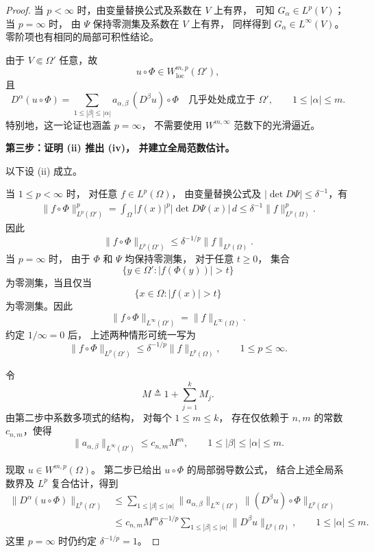 \documentclass[../../main.tex]{subfiles}%
\begin{document}
\begin{proof}
当 $p<\infty$ 时，由变量替换公式及系数在 $V$ 上有界，
可知 $G_\alpha\in L^p(V)$；
当 $p=\infty$ 时，
由 $\Psi$ 保持零测集及系数在 $V$ 上有界，
同样得到 $G_\alpha\in L^\infty(V)$。
零阶项也有相同的局部可积性结论。

由于 $V\Subset\Omega'$ 任意，故
\[
u\circ\Phi\in W^{m,p}_{\mathrm{loc}}(\Omega'),
\]
且
\[
D^\alpha(u\circ\Phi)
=
\sum_{1\leqslant|\beta|\leqslant|\alpha|}
a_{\alpha,\beta}\,(D^\beta u)\circ\Phi
\quad\text{几乎处处成立于 }\Omega',
\qquad 1\leqslant|\alpha|\leqslant m.
\]
特别地，这一论证也涵盖 $p=\infty$，
不需要使用 $W^{m,\infty}$ 范数下的光滑逼近。

\medskip
\noindent
\textbf{第三步：证明 \textup{(ii)} 推出 \textup{(iv)}，
并建立全局范数估计。}

以下设 \textup{(ii)} 成立。

当 $1\leqslant p<\infty$ 时，
对任意 $f\in L^p(\Omega)$，
由变量替换公式及
$|\det D\Psi|\leqslant\delta^{-1}$，有
\begin{align*}
\|f\circ\Phi\|_{L^p(\Omega')}^p
=
\int_{\Omega}|f(x)|^p|\det D\Psi(x)|\,d
\leqslant
\delta^{-1}\|f\|_{L^p(\Omega)}^p.
\end{align*}
因此
\[
\|f\circ\Phi\|_{L^p(\Omega')}
\leqslant
\delta^{-1/p}\|f\|_{L^p(\Omega)}.
\]
当 $p=\infty$ 时，
由于 $\Phi$ 和 $\Psi$ 均保持零测集，
对于任意 $t\geqslant0$，
集合
\[
\{y\in\Omega':|f(\Phi(y))|>t\}
\]
为零测集，当且仅当
\[
\{x\in\Omega:|f(x)|>t\}
\]
为零测集。因此
\[
\|f\circ\Phi\|_{L^\infty(\Omega')}
=
\|f\|_{L^\infty(\Omega)}.
\]
约定 $1/\infty=0$ 后，
上述两种情形可统一写为
\[
\|f\circ\Phi\|_{L^p(\Omega')}
\leqslant
\delta^{-1/p}\|f\|_{L^p(\Omega)},
\qquad 1\leqslant p\leqslant\infty.
\]

令
\[
M\triangleq1+\sum_{j=1}^kM_j.
\]
由第二步中系数多项式的结构，
对每个 $1\leqslant m\leqslant k$，
存在仅依赖于 $n,m$ 的常数 $c_{n,m}$，使得
\[
\|a_{\alpha,\beta}\|_{L^\infty(\Omega')}
\leqslant c_{n,m}M^m,
\qquad
1\leqslant|\beta|\leqslant|\alpha|\leqslant m.
\]

现取 $u\in W^{m,p}(\Omega)$。
第二步已给出 $u\circ\Phi$ 的局部弱导数公式，
结合上述全局系数界及 $L^p$ 复合估计，得到
\begin{align*}
\|D^\alpha(u\circ\Phi)\|_{L^p(\Omega')}
&\leqslant
\sum_{1\leqslant|\beta|\leqslant|\alpha|}
\|a_{\alpha,\beta}\|_{L^\infty(\Omega')}
\|(D^\beta u)\circ\Phi\|_{L^p(\Omega')}\\
&\leqslant
c_{n,m}M^m\delta^{-1/p}
\sum_{1\leqslant|\beta|\leqslant|\alpha|}
\|D^\beta u\|_{L^p(\Omega)},
\qquad 1\leqslant|\alpha|\leqslant m.
\end{align*}
这里 $p=\infty$ 时仍约定 $\delta^{-1/p}=1$。


\end{proof}
\end{document}

